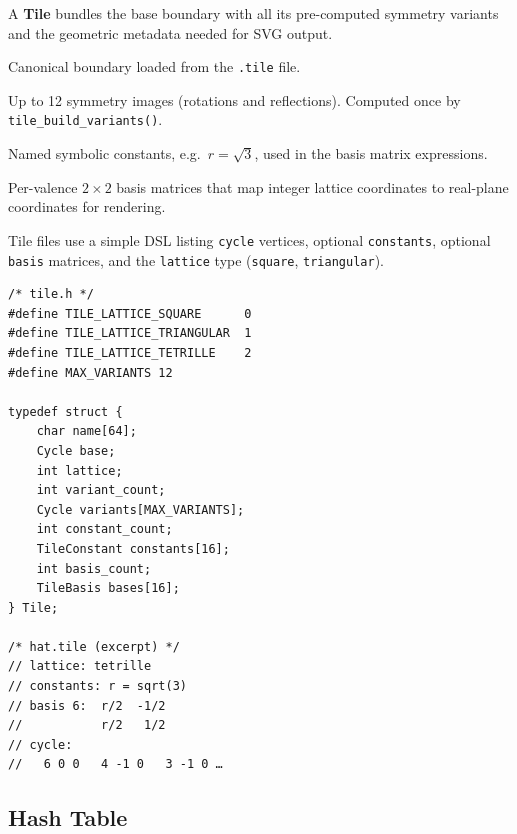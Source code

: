 \documentclass[10pt,a4paper]{article}
\newcommand{\code}[1]{\texttt{\small #1}}
\newcommand{\file}[1]{\texttt{\footnotesize #1}}
\begin{document}
\begin{tcolorbox}[dualbox, title=Tile — \file{src/core/tile.h}]
  A \textbf{Tile} bundles the base boundary with all its pre-computed
  symmetry variants and the geometric metadata needed for SVG output.

  \begin{description}[leftmargin=0pt]
    \item[\code{base}] Canonical boundary loaded from the
      \file{.tile} file.
    \item[\code{variants}] Up to 12 symmetry images (rotations and
      reflections).  Computed once by \code{tile\_build\_variants()}.
    \item[\code{constants}] Named symbolic constants, e.g.\ $r =
      \sqrt{3}$, used in the basis matrix expressions.
    \item[\code{bases}] Per-valence $2{\times}2$ basis matrices that
      map integer lattice coordinates to real-plane coordinates for
      rendering.
  \end{description}

  Tile files use a simple DSL listing \code{cycle} vertices,
  optional \code{constants}, optional \code{basis} matrices,
  and the \code{lattice} type (\code{square}, \code{triangular}).
\tcblower
\begin{verbatim}
/* tile.h */
#define TILE_LATTICE_SQUARE      0
#define TILE_LATTICE_TRIANGULAR  1
#define TILE_LATTICE_TETRILLE    2
#define MAX_VARIANTS 12

typedef struct {
    char name[64];
    Cycle base;
    int lattice;
    int variant_count;
    Cycle variants[MAX_VARIANTS];
    int constant_count;
    TileConstant constants[16];
    int basis_count;
    TileBasis bases[16];
} Tile;

/* hat.tile (excerpt) */
// lattice: tetrille
// constants: r = sqrt(3)
// basis 6:  r/2  -1/2
//           r/2   1/2
// cycle:
//   6 0 0   4 -1 0   3 -1 0 …
\end{verbatim}
\end{tcolorbox}

\subsection{Hash Table}
\end{document}
